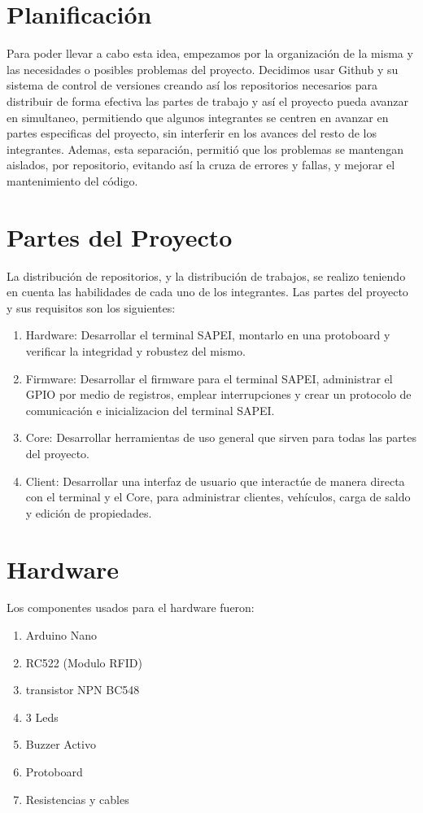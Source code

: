 \documentclass[a4paper, 12pt]{report}
\begin{document}
\newpage
\section{Planificación}
    Para poder llevar a cabo esta idea, empezamos por la organización de la misma y las necesidades o posibles
    problemas del proyecto. Decidimos usar Github y su sistema de control de versiones
    creando así los repositorios necesarios para distribuir de forma efectiva las partes de trabajo y así el proyecto
    pueda avanzar en simultaneo, permitiendo que algunos integrantes se centren en avanzar en partes especificas
    del proyecto, sin interferir en los avances del resto de los integrantes. Ademas, esta separación, permitió que
    los problemas se mantengan aislados, por repositorio, evitando así la cruza de errores y fallas, y mejorar el
    mantenimiento del código.

\section{Partes del Proyecto}
    La distribución de repositorios, y la distribución de trabajos, se realizo teniendo en cuenta las habilidades de
    cada uno de los integrantes. Las partes del proyecto y sus requisitos son los siguientes:
    \begin{enumerate}
        \item Hardware: Desarrollar el terminal SAPEI, montarlo en una protoboard y verificar la integridad y robustez
            del mismo.
        \item Firmware: Desarrollar el firmware para el terminal SAPEI, administrar el GPIO por medio de registros,
            emplear interrupciones y crear un protocolo de comunicación e inicializacion del terminal SAPEI.
        \item Core: Desarrollar herramientas de uso general que sirven para todas las partes del proyecto.
        \item Client: Desarrollar una interfaz de usuario que interactúe de manera directa con el terminal y el Core,
            para administrar clientes, vehículos, carga de saldo y edición de propiedades.
    \end{enumerate}

\newpage
\section{Hardware}
    Los componentes usados para el hardware fueron:
    \begin{enumerate}
        \item Arduino Nano
        \item RC522 (Modulo RFID)
        \item transistor NPN BC548
        \item 3 Leds
        \item Buzzer Activo
        \item Protoboard
        \item Resistencias y cables
    \end{enumerate}
\end{document}
